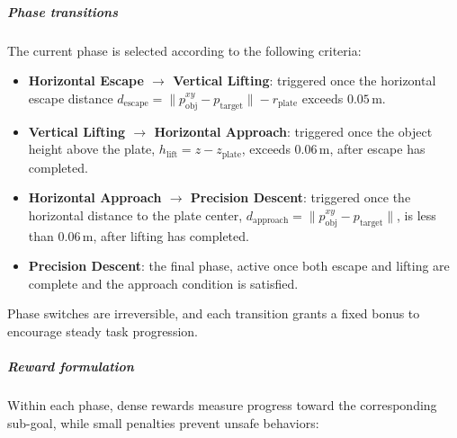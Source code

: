\documentclass[english, 12pt, a4paper, elec, utf8, a-2b, online]{aaltothesis}
\begin{document}
\subparagraph{Phase transitions}  
The current phase is selected according to the following criteria:
\begin{itemize}
    \item \textbf{Horizontal Escape $\to$ Vertical Lifting}: triggered once the horizontal escape distance $d_\text{escape} = \|p_\text{obj}^{xy} - p_\text{target}\| - r_\text{plate}$ exceeds $0.05$\,m.
    \item \textbf{Vertical Lifting $\to$ Horizontal Approach}: triggered once the object height above the plate, $h_\text{lift} = z - z_\text{plate}$, exceeds $0.06$\,m, after escape has completed.
    \item \textbf{Horizontal Approach $\to$ Precision Descent}: triggered once the horizontal distance to the plate center, $d_\text{approach} = \|p_\text{obj}^{xy} - p_\text{target}\|$, is less than $0.06$\,m, after lifting has completed.
    \item \textbf{Precision Descent}: the final phase, active once both escape and lifting are complete and the approach condition is satisfied.
\end{itemize}
Phase switches are irreversible, and each transition grants a fixed bonus to encourage steady task progression.

\subparagraph{Reward formulation}  
Within each phase, dense rewards measure progress toward the corresponding sub-goal, while small penalties prevent unsafe behaviors:
\end{document}
